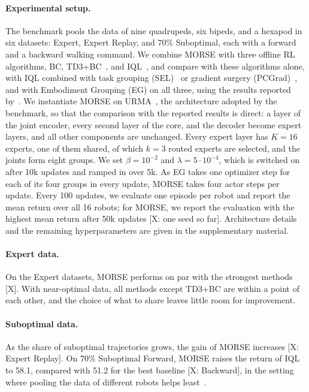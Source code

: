 \paragraph{Experimental setup.}
The benchmark pools the data of nine quadrupeds, six bipeds, and a hexapod in six datasets: Expert, Expert Replay, and
70\% Suboptimal, each with a forward and a backward walking command. We combine MORSE with three offline RL
algorithms, BC, TD3+BC~\citep{fujimoto2021minimalist}, and IQL~\citep{kostrikov2022iql}, and compare with these
algorithms alone, with IQL combined with task grouping (SEL)~\citep{jeong2025sel} or gradient surgery
(PCGrad)~\citep{yu2020pcgrad}, and with Embodiment Grouping (EG) on all three, using the results reported
by~\citet{abe2026crossembodimentoffline}. We instantiate MORSE on URMA~\citep{bohlinger2024onepolicy}, the
architecture adopted by the benchmark, so that the comparison with the reported results is direct: a layer of the
joint encoder, every second layer of the core, and the decoder become expert layers, and all other components are
unchanged. Every expert layer has $K=16$ experts, one of them shared, of which $k=3$ routed experts are selected, and
the joints form eight groups. We set $\beta=10^{-2}$ and $\lambda=5\cdot10^{-4}$, which is switched on after 10k
updates and ramped in over 5k. As EG takes one optimizer step for each of its four groups in every update, MORSE takes
four actor steps per update. Every 100 updates, we evaluate one episode per robot and report the mean return over all
16 robots; for MORSE, we report the evaluation with the highest mean return after 50k updates [X: one seed so far].
Architecture details and the remaining hyperparameters are given in the supplementary material.

\paragraph{Expert data.}
On the Expert datasets, MORSE performs on par with the strongest methods [X]. With near-optimal data, all methods
except TD3+BC are within a point of each other, and the choice of what to share leaves little room for improvement.

\paragraph{Suboptimal data.}
As the share of suboptimal trajectories grows, the gain of MORSE increases [X: Expert Replay]. On 70\% Suboptimal
Forward, MORSE raises the return of IQL to 58.1, compared with 51.2 for the best baseline [X: Backward], in the
setting where pooling the data of different robots helps least~\citep{abe2026crossembodimentoffline}.

